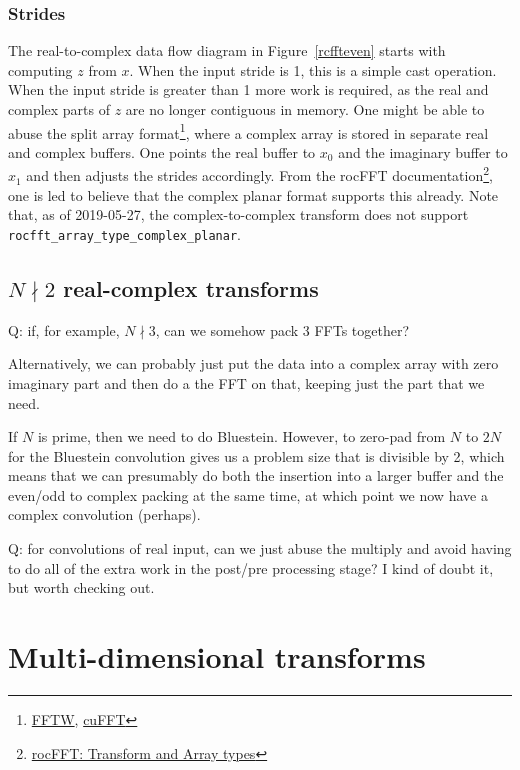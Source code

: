 \documentclass[12pt]{article}
\renewcommand{\(}{\left(}
\renewcommand{\)}{\right)}
\begin{document}
\subsubsection{Strides}
The real-to-complex data flow diagram in Figure~\ref{rcffteven} starts
with computing $z$ from $x$.  When the input stride is 1, this is a
simple cast operation.  When the input stride is greater than 1 more
work is required, as the real and complex parts of $z$ are no longer
contiguous in memory.  One might be able to abuse the split array
format\footnote{\href{http://www.fftw.org/fftw3_doc/Interleaved-and-split-arrays.html}{FFTW},
  \href{https://docs.nvidia.com/cuda/cufft/index.html}{cuFFT}}, where
a complex array is stored in separate real and complex buffers.  One
points the real buffer to $x_0$ and the imaginary buffer to $x_1$ and
then adjusts the strides accordingly.  From the rocFFT
documentation\footnote{\href{https://rocfft.readthedocs.io/en/latest/library.html\#transform-and-array-types}{rocFFT:
    Transform and Array types}}, one is led to believe that the
complex planar format supports this already.  Note that, as of
2019-05-27, the complex-to-complex transform does not support
\lstinline{rocfft_array_type_complex_planar}.


\subsection{$N\nmid{}2$ real-complex transforms}

Q: if, for example, $N\nmid{}3$, can we somehow pack 3 FFTs together?

Alternatively, we can probably just put the data into a complex array
with zero imaginary part and then do a the FFT on that, keeping just
the part that we need.

If $N$ is prime, then we need to do Bluestein.  However, to zero-pad
from $N$ to $2N$ for the Bluestein convolution gives us a problem size
that is divisible by 2, which means that we can presumably do both the
insertion into a larger buffer and the even/odd to complex packing at
the same time, at which point we now have a complex convolution
(perhaps).

Q: for convolutions of real input, can we just abuse the multiply and
avoid having to do all of the extra work in the post/pre processing
stage?  I kind of doubt it, but worth checking out.

\section{Multi-dimensional transforms}
\end{document}

